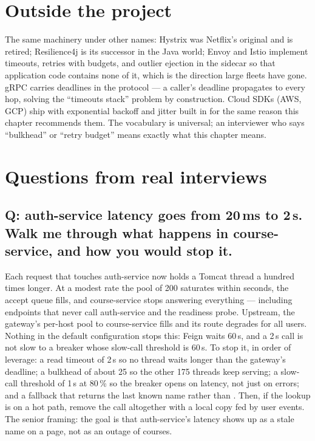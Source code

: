 \section{Outside the project}

The same machinery under other names: Hystrix was Netflix's original
and is retired; Resilience4j is its successor in the Java world;
Envoy and Istio implement timeouts, retries with budgets, and outlier
ejection in the sidecar so that application code contains none of it,
which is the direction large fleets have gone. gRPC carries deadlines
in the protocol --- a caller's deadline propagates to every hop, solving
the ``timeouts stack'' problem by construction. Cloud SDKs (AWS, GCP)
ship with exponential backoff and jitter built in for the same reason
this chapter recommends them. The vocabulary is universal; an
interviewer who says ``bulkhead'' or ``retry budget'' means exactly
what this chapter means.

\section{Questions from real interviews}

\subsection*{Q: auth-service latency goes from 20\,ms to 2\,s. Walk me through what happens in course-service, and how you would stop it.}

Each request that touches auth-service now holds a Tomcat thread a
hundred times longer. At a modest rate the pool of 200 saturates within
seconds, the accept queue fills, and course-service stops answering
everything --- including endpoints that never call auth-service and the
readiness probe. Upstream, the gateway's per-host pool to course-service
fills and its route degrades for all users. Nothing in the default
configuration stops this: Feign waits 60\,s, and a 2\,s call is not
slow to a breaker whose slow-call threshold is 60\,s. To stop it, in
order of leverage: a read timeout of 2\,s so no thread waits longer
than the gateway's deadline; a bulkhead of about 25 so the other 175
threads keep serving; a slow-call threshold of 1\,s at 80\,\% so the
breaker opens on latency, not just on errors; and a fallback that
returns the last known name rather than . Then, if the
lookup is on a hot path, remove the call altogether with a local copy
fed by user events. The senior framing: the goal is that auth-service's
latency shows up as a stale name on a page, not as an outage of
courses.


